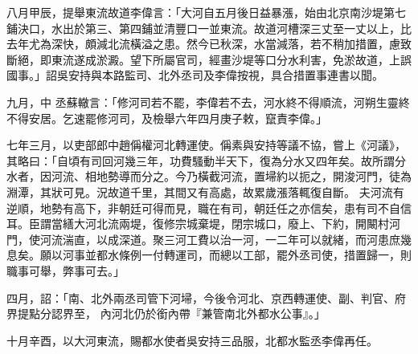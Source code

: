 \begin{pinyinscope}
 八月甲辰，提舉東流故道李偉言：「大河自五月後日益暴漲，始由北京南沙堤第七鋪決口，水出於第三、第四鋪並清豐口一並東流。故道河槽深三丈至一丈以上，比去年尤為深快，頗減北流橫溢之患。然今已秋深，水當減落，若不稍加措置，慮致斷絕，即東流遂成淤澱。望下所屬官司，經畫沙堤等口分水利害，免淤故道，上誤國事。」詔吳安持與本路監司、北外丞司及李偉按視，具合措置事連書以聞。



 九月，中
 丞蘇轍言：「修河司若不罷，李偉若不去，河水終不得順流，河朔生靈終不得安居。乞速罷修河司，及檢舉六年四月庚子敕，竄責李偉。」



 七年三月，以吏部郎中趙偁權河北轉運使。偁素與安持等議不協，嘗上《河議》，其略曰：「自頃有司回河幾三年，功費騷動半天下，復為分水又四年矣。故所謂分水者，因河流、相地勢導而分之。今乃橫截河流，置埽約以扼之，開浚河門，徒為淵潭，其狀可見。況故道千里，其間又有高處，故累歲漲落輒復自斷。
 夫河流有逆順，地勢有高下，非朝廷可得而見，職在有司，朝廷任之亦信矣，患有司不自信耳。臣謂當繕大河北流兩堤，復修宗城棄堤，閉宗城口，廢上、下約，開闞村河門，使河流湍直，以成深道。聚三河工費以治一河，一二年可以就緒，而河患庶幾息矣。願以河事並都水條例一付轉運司，而總以工部，罷外丞司使，措置歸一，則職事可舉，弊事可去。」



 四月，詔：「南、北外兩丞司管下河埽，今後令河北、京西轉運使、副、判官、府界提點分認界至，
 內河北仍於銜內帶『兼管南北外都水公事』。」



 十月辛酉，以大河東流，賜都水使者吳安持三品服，北都水監丞李偉再任。



\end{pinyinscope}